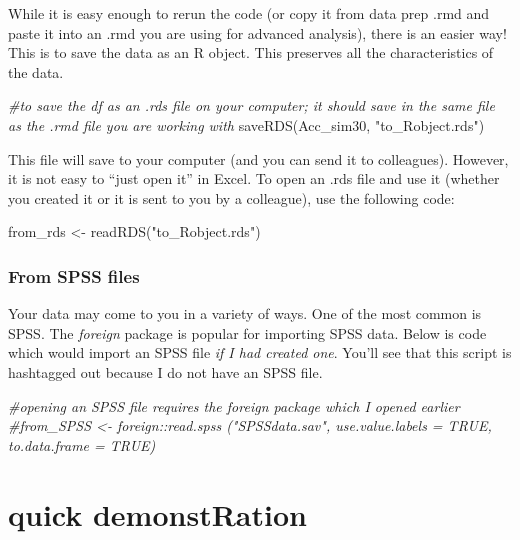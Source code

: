 \documentclass[
  english,
]{book}
\newenvironment{Shaded}{\begin{snugshade}}{\end{snugshade}}
\newcommand{\CommentTok}[1]{\textcolor[rgb]{0.56,0.35,0.01}{\textit{#1}}}
\newcommand{\FunctionTok}[1]{\textcolor[rgb]{0.00,0.00,0.00}{#1}}
\newcommand{\NormalTok}[1]{#1}
\newcommand{\OtherTok}[1]{\textcolor[rgb]{0.56,0.35,0.01}{#1}}
\newcommand{\StringTok}[1]{\textcolor[rgb]{0.31,0.60,0.02}{#1}}
\begin{document}
While it is easy enough to rerun the code (or copy it from data prep .rmd and paste it into an .rmd you are using for advanced analysis), there is an easier way! This is to save the data as an R object. This preserves all the characteristics of the data.

\begin{Shaded}
\begin{Highlighting}[]
\CommentTok{\#to save the df as an .rds file on your computer; it should save in the same file as the .rmd file you are working with}
\FunctionTok{saveRDS}\NormalTok{(Acc\_sim30, }\StringTok{"to\_Robject.rds"}\NormalTok{)}
\end{Highlighting}
\end{Shaded}

This file will save to your computer (and you can send it to colleagues). However, it is not easy to ``just open it'' in Excel. To open an .rds file and use it (whether you created it or it is sent to you by a colleague), use the following code:

\begin{Shaded}
\begin{Highlighting}[]
\NormalTok{from\_rds }\OtherTok{\textless{}{-}} \FunctionTok{readRDS}\NormalTok{(}\StringTok{"to\_Robject.rds"}\NormalTok{)}
\end{Highlighting}
\end{Shaded}

\hypertarget{from-spss-files}{%
\subsubsection{From SPSS files}\label{from-spss-files}}

Your data may come to you in a variety of ways. One of the most common is SPSS. The \emph{foreign} package is popular for importing SPSS data. Below is code which would import an SPSS file \emph{if I had created one}. You'll see that this script is hashtagged out because I do not have an SPSS file.

\begin{Shaded}
\begin{Highlighting}[]
\CommentTok{\#opening an SPSS file requires the foreign package which I opened earlier}
\CommentTok{\#from\_SPSS \textless{}{-} foreign::read.spss ("SPSSdata.sav", use.value.labels = TRUE, to.data.frame = TRUE)}
\end{Highlighting}
\end{Shaded}

\hypertarget{quick-demonstration}{%
\section{quick demonstRation}\label{quick-demonstration}}
\end{document}
